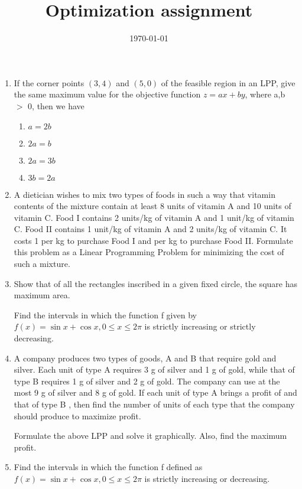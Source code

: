\documentclass[12pt]{article}
\title{Optimization assignment}
\date{\today}
\begin{document}

\begin{enumerate}

\item If the corner points $(3,4)$ and $(5,0)$ of the feasible region in an LPP, give the same maximum value for the objective function $z=ax+by$, where a,b $>$ 0, then we have 


\begin{enumerate}
\item $a=2b$
\item $2a=b$
\item $2a=3b$
\item $3b=2a$
\end{enumerate}

\item A dietician wishes to mix two types of foods in such a way that vitamin contents of the mixture contain at least 8 units of vitamin A and 10 units of vitamin C. Food I contains 2 units/kg of vitamin A and 1 unit/kg of vitamin C. Food II contains 1  unit/kg of vitamin A and 2 units/kg of vitamin C. It costs 1  per kg to purchase Food I and   per kg to purchase Food II. Formulate this problem as a Linear Programming Problem for minimizing the cost of such a mixture.

\item Show that of all the rectangles inscribed in a given fixed circle, the square has maximum area.



Find the intervals in which the function f given by $f(x) = \sin x + \cos x, 0 \le x \le 2\pi$ is strictly increasing or strictly decreasing.

\item A company produces two types of goods, A and B that require gold and silver. Each unit of type A requires 3 g of silver and 1 g of gold, while that of type B requires 1 g of silver and 2 g of gold. The company can use at the most 9 g of silver and 8 g of gold. If each unit of type A brings a profit of      and that of type B     , then find the number of units of each type that the company should produce to maximize profit.

Formulate the above LPP and solve it graphically. Also, find the maximum profit.


\item Find the intervals in which the function f defined as $f(x) = \sin x + \cos x, 0 \le x \le 2\pi$ is strictly increasing or decreasing.




\end{enumerate}
\end{document}

